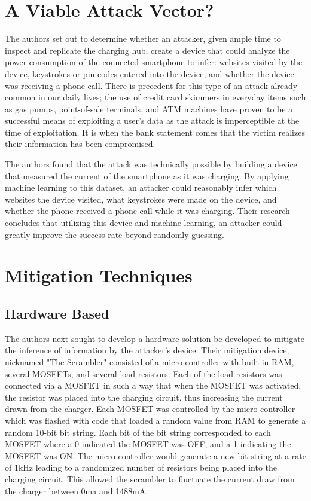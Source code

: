 \section{A Viable Attack Vector?}
The authors set out to determine whether an attacker, given ample time to inspect and replicate the charging hub, create a device that could analyze the power consumption of the connected smartphone to infer: websites visited by the device, keystrokes or pin codes entered into the device, and whether the device was receiving a phone call. There is precedent for this type of an attack already common in our daily lives; the use of credit card skimmers in everyday items such as gas pumps, point-of-sale terminals, and ATM machines have proven to be a successful means of exploiting a user's data as the attack is imperceptible at the time of exploitation. It is when the bank statement comes that the victim realizes their information has been compromised. 

The authors found that the attack was technically possible by building a device that measured the current of the smartphone as it was charging. By applying machine learning to this dataset, an attacker could reasonably infer which websites the device visited, what keystrokes were made on the device, and whether the phone received a phone call while it was charging. Their research concludes that utilizing this device and machine learning, an attacker could greatly improve the success rate beyond randomly guessing.

\section{Mitigation Techniques}
\subsection{Hardware Based}
The authors next sought to develop a hardware solution be developed to mitigate the inference of information by the attacker's device. Their mitigation device, nicknamed "The Scrambler" consisted of a micro controller with built in RAM, several MOSFETs, and several load resistors. Each of the load resistors was connected via a MOSFET in such a way that when the MOSFET was activated, the resistor was placed into the charging circuit, thus increasing the current drawn from the charger. Each MOSFET was controlled by the micro controller which was flashed with code that loaded a random value from RAM to generate a random 10-bit bit string. Each bit of the bit string corresponded to each MOSFET where a 0 indicated the MOSFET was OFF, and a 1 indicating the MOSFET was ON. The micro controller would generate a new bit string at a rate of 1kHz leading to a randomized number of resistors being placed into the charging circuit. This allowed the scrambler to fluctuate the current draw from the charger between 0ma and 1488mA. \cite{10.1145/3374664.3375732}

